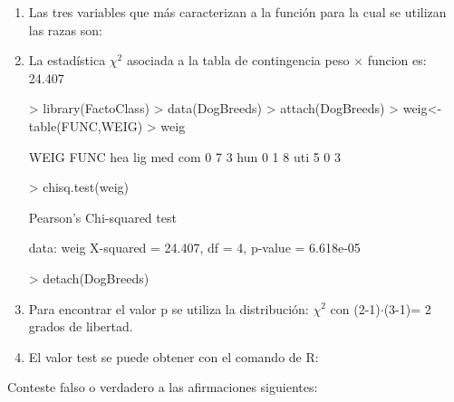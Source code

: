 \documentclass[letterpaper, 12pt]{article}
\begin{document}
\newpage 
\begin{enumerate}

\item Las tres variables que más caracterizan a la función para la cual se
utilizan las razas son: 

\item La estadística $\chi^2$ asociada a la tabla de contingencia peso × funcion
es: 24.407
\begin{Schunk}
\begin{Sinput}
> library(FactoClass)
> data(DogBreeds)
> attach(DogBreeds)
> weig<-table(FUNC,WEIG)
> weig
\end{Sinput}
\begin{Soutput}
     WEIG
FUNC  hea lig med
  com   0   7   3
  hun   0   1   8
  uti   5   0   3
\end{Soutput}
\begin{Sinput}
> chisq.test(weig)
\end{Sinput}
\begin{Soutput}
	Pearson's Chi-squared test

data:  weig
X-squared = 24.407, df = 4, p-value = 6.618e-05
\end{Soutput}
\begin{Sinput}
> detach(DogBreeds)
\end{Sinput}
\end{Schunk}
\item Para encontrar el valor p se utiliza la distribución: $\chi^2$ con (2-1)$\cdot$(3-1)= 2 grados de libertad.
\item El valor test se puede obtener con el comando de R:
\end{enumerate}
Conteste falso o verdadero a las afirmaciones siguientes:
\end{document}
